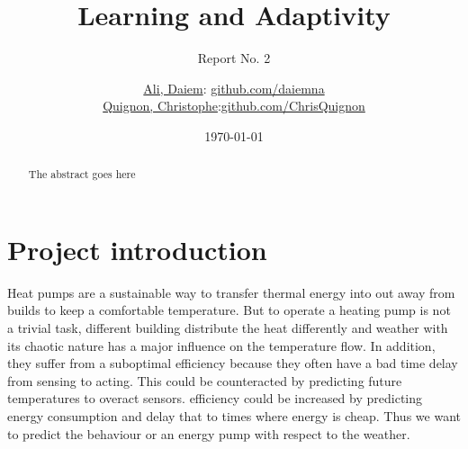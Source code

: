 \documentclass{scrartcl}
\begin{document}
\title{Learning and Adaptivity}
\subtitle{Report No. 2}
\author{
  \href{daiem.ali@smail.inf.h-brs.de}{Ali, Daiem}: \href{https://github.com/daiemna}{github.com/daiemna}\\
  \href{christophe.quignon@smail.inf.h-brs.de}{Quignon, Christophe}:\href{https://github.com/ChrisQuignon}{github.com/ChrisQuignon}
}
\date{\today}


\maketitle



\begin{abstract}
The abstract goes here
\end{abstract}


\section{Project introduction}

Heat pumps are a sustainable way to transfer thermal energy into out away from builds to keep a comfortable temperature. But to operate a heating pump is not a trivial task, different building distribute the heat differently and weather with its chaotic nature has a major influence on the temperature flow. In addition, they suffer from a suboptimal efficiency because they often have a bad time delay from sensing to acting. This could be counteracted by predicting future temperatures to overact sensors. efficiency could be increased by predicting energy consumption and delay that to times where energy is cheap. 
Thus we want to predict the behaviour or an energy pump with respect to the weather.
\end{document}

